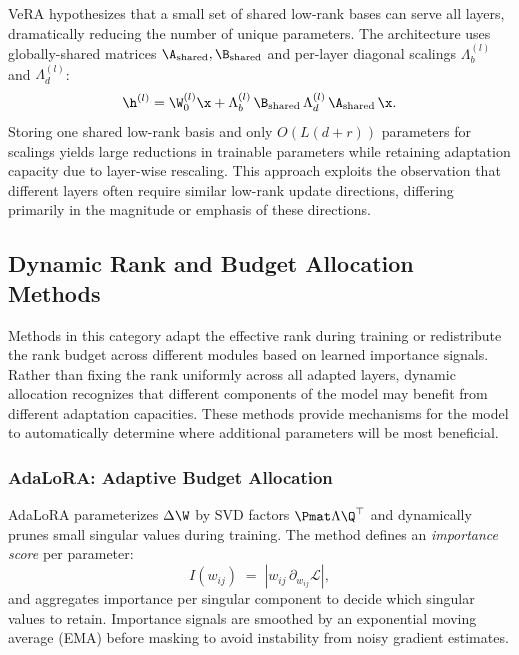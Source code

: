 VeRA hypothesizes that a small set of shared low-rank bases can serve all layers, dramatically reducing the number of unique parameters. The architecture uses globally-shared matrices $\A_{\text{shared}},\B_{\text{shared}}$ and per-layer diagonal scalings $\Lambda_b^{(l)}$ and $\Lambda_d^{(l)}$:
\begin{equation}
  \h^{(l)} = \W_0^{(l)}\x + \Lambda_b^{(l)}\,\B_{\text{shared}}\,\Lambda_d^{(l)}\,\A_{\text{shared}}\,\x.
\end{equation}
Storing one shared low-rank basis and only $O(L(d + r))$ parameters for scalings yields large reductions in trainable parameters while retaining adaptation capacity due to layer-wise rescaling. This approach exploits the observation that different layers often require similar low-rank update directions, differing primarily in the magnitude or emphasis of these directions.

\subsection{Dynamic Rank and Budget Allocation Methods}
\label{subsec:dynamic}

Methods in this category adapt the effective rank during training or redistribute the rank budget across different modules based on learned importance signals. Rather than fixing the rank uniformly across all adapted layers, dynamic allocation recognizes that different components of the model may benefit from different adaptation capacities. These methods provide mechanisms for the model to automatically determine where additional parameters will be most beneficial.

\subsubsection{AdaLoRA: Adaptive Budget Allocation}
\label{subsubsec:adalora}

AdaLoRA parameterizes $\Delta\W$ by SVD factors $\Pmat\Lambda\Q^\top$ and dynamically prunes small singular values during training. The method defines an \emph{importance score} per parameter:
\begin{equation}
  I(w_{ij}) \;=\; | w_{ij}\,\partial_{w_{ij}}\mathcal{L} |,
\end{equation}
and aggregates importance per singular component to decide which singular values to retain. Importance signals are smoothed by an exponential moving average (EMA) before masking to avoid instability from noisy gradient estimates.

